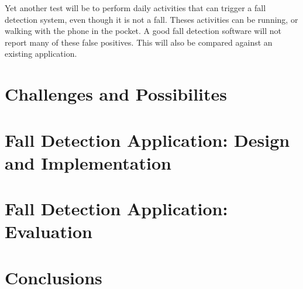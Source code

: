 \documentclass[12pt, a4paper, onecolumn]{article}
\begin{document}
	Yet another test will be to perform daily activities that can trigger a fall detection system, even though it is not a fall. Theses activities can be running, or walking with the phone in the pocket. A good fall detection software will not report many of these false positives. This will also be compared against an existing application.
	
	\newpage
	
	\section{Challenges and Possibilites}
	\newpage
	
	\section{Fall Detection Application: Design and Implementation}
	\newpage
	
	\section{Fall Detection Application: Evaluation}
	\newpage
	
	\section{Conclusions}
	\newpage
	
	
	
	
\end{document}
